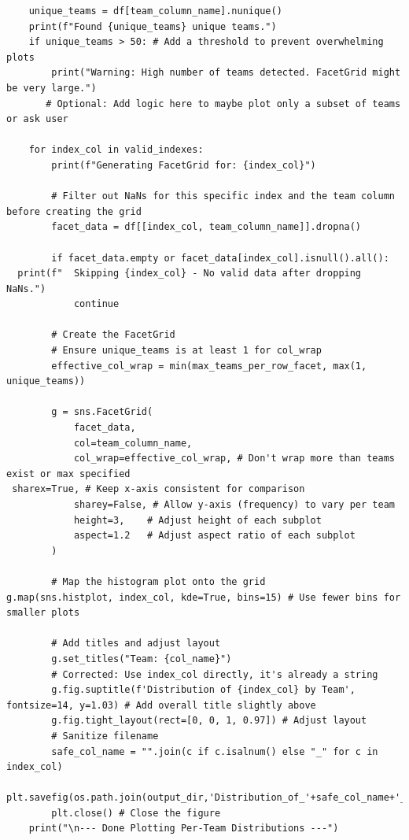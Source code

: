 \documentclass[12pt]{report}
\begin{document}
{{\begin{lstlisting}
    unique_teams = df[team_column_name].nunique()
    print(f"Found {unique_teams} unique teams.")
    if unique_teams > 50: # Add a threshold to prevent overwhelming plots
        print("Warning: High number of teams detected. FacetGrid might be very large.")
       # Optional: Add logic here to maybe plot only a subset of teams or ask user

    for index_col in valid_indexes:
        print(f"Generating FacetGrid for: {index_col}")

        # Filter out NaNs for this specific index and the team column before creating the grid
        facet_data = df[[index_col, team_column_name]].dropna()

        if facet_data.empty or facet_data[index_col].isnull().all():
  print(f"  Skipping {index_col} - No valid data after dropping NaNs.")
            continue

        # Create the FacetGrid
        # Ensure unique_teams is at least 1 for col_wrap
        effective_col_wrap = min(max_teams_per_row_facet, max(1, unique_teams))

        g = sns.FacetGrid(
            facet_data,
            col=team_column_name,
            col_wrap=effective_col_wrap, # Don't wrap more than teams exist or max specified
 sharex=True, # Keep x-axis consistent for comparison
            sharey=False, # Allow y-axis (frequency) to vary per team
            height=3,    # Adjust height of each subplot
            aspect=1.2   # Adjust aspect ratio of each subplot
        )

        # Map the histogram plot onto the grid
g.map(sns.histplot, index_col, kde=True, bins=15) # Use fewer bins for smaller plots

        # Add titles and adjust layout
        g.set_titles("Team: {col_name}")
        # Corrected: Use index_col directly, it's already a string
        g.fig.suptitle(f'Distribution of {index_col} by Team', fontsize=14, y=1.03) # Add overall title slightly above
        g.fig.tight_layout(rect=[0, 0, 1, 0.97]) # Adjust layout
        # Sanitize filename
        safe_col_name = "".join(c if c.isalnum() else "_" for c in index_col)
        plt.savefig(os.path.join(output_dir,'Distribution_of_'+safe_col_name+'_by_Team.png'))
        plt.close() # Close the figure
    print("\n--- Done Plotting Per-Team Distributions ---")


\end{lstlisting}}}
\end{document}
